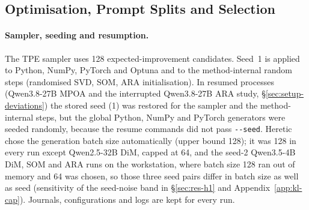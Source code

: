 \subsection{Optimisation, Prompt Splits and Selection}
\label{app:setup-opt}

\paragraph{Sampler, seeding and resumption.} The TPE sampler uses 128
expected-improvement candidates. Seed~1 is applied to Python, NumPy, PyTorch
and Optuna and to the method-internal random steps (randomised SVD, SOM, ARA
initialisation). In resumed processes (Qwen3.8-27B MPOA and the
interrupted Qwen3.8-27B ARA study, \S\ref{sec:setup-deviations}) the stored seed
(1) was restored for the sampler and the method-internal steps, but the global
Python, NumPy and PyTorch generators were seeded randomly, because the resume
commands did not pass \texttt{-{}-seed}. Heretic chose the generation batch size
automatically (upper bound 128); it was 128 in every run except Qwen2.5-32B
DiM, capped at 64, and the seed-2 Qwen3.5-4B DiM, SOM and ARA runs on the
workstation, where batch size 128 ran out of memory and 64 was chosen, so
those three seed pairs differ in batch size as well as seed (sensitivity of the
seed-noise band in \S\ref{sec:res-h1} and Appendix~\ref{app:kl-cap}).
Journals, configurations and logs are kept for every run.

